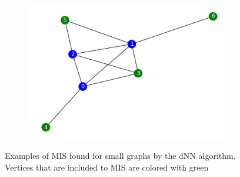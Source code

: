 \begin{figure}
\begin{subfigure}{\linewidth}
  \includegraphics[width=.4\linewidth]{figures/small_graphs/6.png}
  \end{subfigure}\par\medskip
  \caption{Examples of MIS found for small graphs by the dNN algorithm. Vertices that are included to MIS are colored with green} \label{figure:graphs_examples}
\end{figure}

